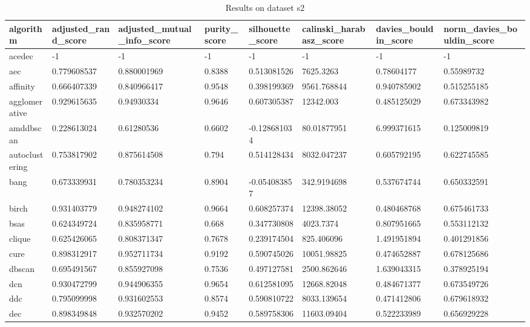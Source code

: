 \begin{table}[H]
\centering
\caption{Results on dataset s2}
\label{S66_Table}
\begin{tabular}{|l|l|l|l|l|l|l|l|}
\hline
algorithm & adjusted\_rand\_score & adjusted\_mutual\_info\_score & purity\_score & silhouette\_score & calinski\_harabasz\_score & davies\_bouldin\_score & norm\_davies\_bouldin\_score \\
\hline
acedec & -1 & -1 & -1 & -1 & -1 & -1 & -1 \\
\hline
aec & 0.779608537 & 0.880001969 & 0.8388 & 0.513081526 & 7625.3263 & 0.78604177 & 0.55989732 \\
\hline
affinity & 0.666407339 & 0.840966417 & 0.9548 & 0.398199369 & 9561.768844 & 0.940785902 & 0.515255185 \\
\hline
agglomerative & 0.929615635 & 0.94930334 & 0.9646 & 0.607305387 & 12342.003 & 0.485125029 & 0.673343982 \\
\hline
amddbscan & 0.228613024 & 0.61280536 & 0.6602 & -0.128681034 & 80.01877951 & 6.999371615 & 0.125009819 \\
\hline
autoclustering & 0.753817902 & 0.875614508 & 0.794 & 0.514128434 & 8032.047237 & 0.605792195 & 0.622745585 \\
\hline
bang & 0.673339931 & 0.780353234 & 0.8904 & -0.054083857 & 342.9194698 & 0.537674744 & 0.650332591 \\
\hline
birch & 0.931403779 & 0.948274102 & 0.9664 & 0.608257374 & 12398.38052 & 0.480468768 & 0.675461733 \\
\hline
bsas & 0.624349724 & 0.835958771 & 0.668 & 0.347730808 & 4023.7374 & 0.807951665 & 0.553112132 \\
\hline
clique & 0.625426065 & 0.808371347 & 0.7678 & 0.239174504 & 825.406096 & 1.491951894 & 0.401291856 \\
\hline
cure & 0.898312917 & 0.952711734 & 0.9192 & 0.590745026 & 10051.98825 & 0.474652887 & 0.678125686 \\
\hline
dbscan & 0.695491567 & 0.855927098 & 0.7536 & 0.497127581 & 2500.862646 & 1.639043315 & 0.378925194 \\
\hline
dcn & 0.930472799 & 0.944906355 & 0.9654 & 0.612581095 & 12668.82048 & 0.484671377 & 0.673549726 \\
\hline
ddc & 0.795099998 & 0.931602553 & 0.8574 & 0.590810722 & 8033.139654 & 0.471412806 & 0.679618932 \\
\hline
dec & 0.898349848 & 0.932570202 & 0.9452 & 0.589758306 & 11603.09404 & 0.522233989 & 0.656929228 \\

\end{tabular}
\end{table}

